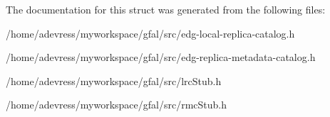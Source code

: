 The documentation for this struct was generated from the following files:\begin{CompactItemize}
\item 
/home/adevress/myworkspace/gfal/src/edg-local-replica-catalog.h\item 
/home/adevress/myworkspace/gfal/src/edg-replica-metadata-catalog.h\item 
/home/adevress/myworkspace/gfal/src/lrc\-Stub.h\item 
/home/adevress/myworkspace/gfal/src/rmc\-Stub.h\end{CompactItemize}
